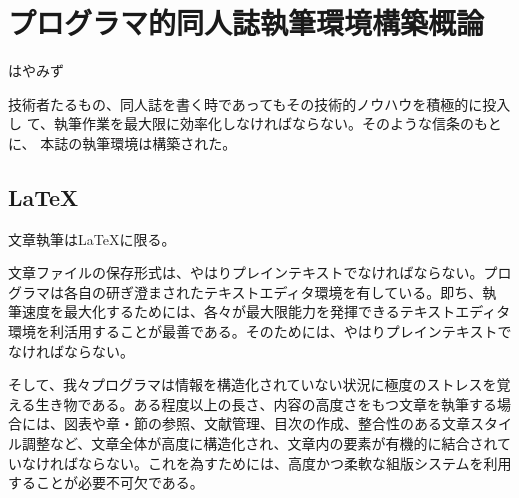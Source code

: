 
\chapter{プログラマ的同人誌執筆環境構築概論}

\begin{flushright}
 はやみず
\end{flushright}

\lettrine{技}
術者たるもの、同人誌を書く時であってもその技術的ノウハウを積極的に投入し
て、執筆作業を最大限に効率化しなければならない。そのような信条のもとに、
本誌の執筆環境は構築された。

% 

\section{LaTeX}

文章執筆はLaTeXに限る。


文章ファイルの保存形式は、やはりプレインテキストでなければならない。プロ
グラマは各自の研ぎ澄まされたテキストエディタ環境を有している。即ち、執
筆速度を最大化するためには、各々が最大限能力を発揮できるテキストエディタ
環境を利活用することが最善である。そのためには、やはりプレインテキストで
なければならない。

そして、我々プログラマは情報を構造化されていない状況に極度のストレスを覚
える生き物である。ある程度以上の長さ、内容の高度さをもつ文章を執筆する場
合には、図表や章・節の参照、文献管理、目次の作成、整合性のある文章スタイ
ル調整など、文章全体が高度に構造化され、文章内の要素が有機的に結合されて
いなければならない。これを為すためには、高度かつ柔軟な組版システムを利用
することが必要不可欠である。

